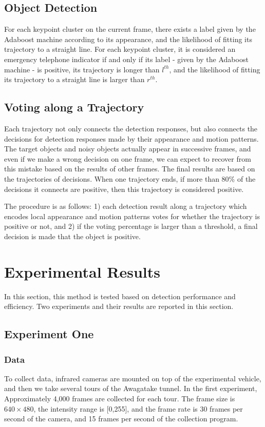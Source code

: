 \subsection{Object Detection}

For each keypoint cluster on the current frame, there exists a label given by the Adaboost machine according to its appearance, and the likelihood of fitting its trajectory to a straight line.  For each keypoint cluster, it is considered an emergency telephone indicator if and only if its label - given by the Adaboost machine - is positive, its trajectory is longer than $l^{th}$, and the likelihood of fitting its trajectory to a straight line is larger than $r^{th}$.


\subsection{Voting along a Trajectory}

Each trajectory not only connects the detection responses, but also connects the decisions for detection responses made by their appearance and motion patterns. The target objects and noisy objects actually appear in successive frames, and even if we make a wrong decision on one frame, we can expect to recover from this mistake based on the results of other frames. The final results are based on the trajectories of decisions. When one trajectory ends, if more than 80\% of the decisions it connects are positive, then this trajectory is considered positive.


The procedure is as follows: 1) each detection result along a trajectory which encodes local appearance and motion patterns votes for whether the trajectory is positive or not, and 2) if the voting percentage is larger than a threshold, a final decision is made that the object is positive.



\section{Experimental Results}
\label{exp}
In this section, this method is tested based on detection performance and efficiency. Two experiments  and their results are reported in this section.

\subsection{Experiment One}

\subsubsection{Data} To collect data, infrared cameras are mounted on top of the experimental vehicle, and then we take several tours of the Awagatake tunnel. In the first experiment,  Approximately 4,000 frames are collected for each tour. The frame size is $640\times 480$, the intensity range is [0,255], and the frame rate is 30 frames per second of the camera, and 15 frames per second of the collection program.

